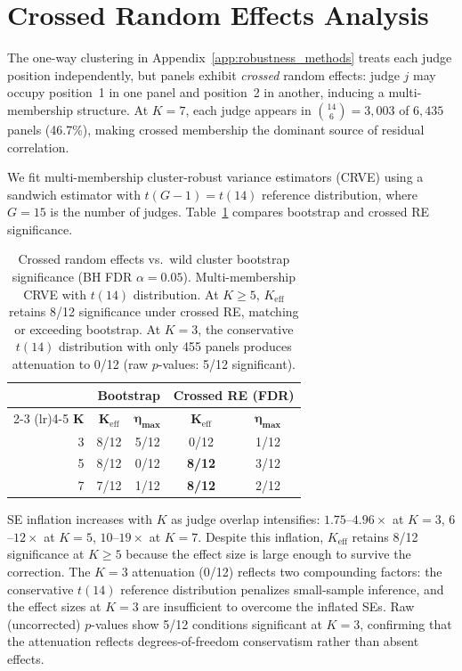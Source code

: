 \FloatBarrier
\section{Crossed Random Effects Analysis}
\label{app:crossed_re}

The one-way clustering in Appendix~\ref{app:robustness_methods} treats each judge position independently, but panels exhibit \emph{crossed} random effects: judge $j$ may occupy position~1 in one panel and position~2 in another, inducing a multi-membership structure. At $K{=}7$, each judge appears in $\binom{14}{6} = 3{,}003$ of $6{,}435$ panels (46.7\%), making crossed membership the dominant source of residual correlation.

We fit multi-membership cluster-robust variance estimators (CRVE) using a sandwich estimator with $t(G{-}1) = t(14)$ reference distribution, where $G{=}15$ is the number of judges. Table~\ref{tab:crossed_re} compares bootstrap and crossed RE significance.

\begin{table}[h]
\centering
\small
\caption{Crossed random effects vs.\ wild cluster bootstrap significance (BH FDR $\alpha{=}0.05$). Multi-membership CRVE with $t(14)$ distribution. At $K{\geq}5$, $K_{\mathrm{eff}}$ retains 8/12 significance under crossed RE, matching or exceeding bootstrap. At $K{=}3$, the conservative $t(14)$ distribution with only 455 panels produces attenuation to 0/12 (raw $p$-values: 5/12 significant).}
\label{tab:crossed_re}
\begin{tabular}{rcccc}
\toprule
& \multicolumn{2}{c}{\textbf{Bootstrap}} & \multicolumn{2}{c}{\textbf{Crossed RE (FDR)}} \\
\cmidrule(lr){2-3} \cmidrule(lr){4-5}
$\boldsymbol{K}$ & $\boldsymbol{K_{\mathrm{eff}}}$ & $\boldsymbol{\eta_{\max}}$ & $\boldsymbol{K_{\mathrm{eff}}}$ & $\boldsymbol{\eta_{\max}}$ \\
\midrule
3 & 8/12 & 5/12 & 0/12 & 1/12 \\
5 & 8/12 & 0/12 & \textbf{8/12} & 3/12 \\
7 & 7/12 & 1/12 & \textbf{8/12} & 2/12 \\
\bottomrule
\end{tabular}
\end{table}

SE inflation increases with $K$ as judge overlap intensifies: $1.75$--$4.96{\times}$ at $K{=}3$, $6$--$12{\times}$ at $K{=}5$, $10$--$19{\times}$ at $K{=}7$. Despite this inflation, $K_{\mathrm{eff}}$ retains 8/12 significance at $K{\geq}5$ because the effect size is large enough to survive the correction. The $K{=}3$ attenuation (0/12) reflects two compounding factors: the conservative $t(14)$ reference distribution penalizes small-sample inference, and the effect sizes at $K{=}3$ are insufficient to overcome the inflated SEs. Raw (uncorrected) $p$-values show 5/12 conditions significant at $K{=}3$, confirming that the attenuation reflects degrees-of-freedom conservatism rather than absent effects.

